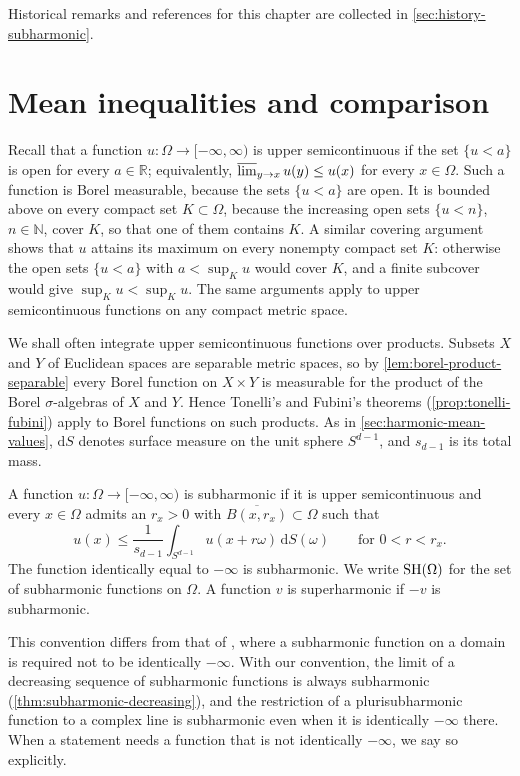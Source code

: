 Historical remarks and references for this chapter are collected in \cref{sec:history-subharmonic}.

\section{Mean inequalities and comparison}
\label{sec:subharmonic-comparison}
Recall that a function $u\colon\Omega\to[-\infty,\infty)$ is upper semicontinuous if the set $\{u<a\}$ is open for every $a\in\mathbb R$; equivalently, $\varlimsup_{y\to x}u(y)\leq u(x)$ for every $x\in\Omega$. Such a function is Borel measurable, because the sets $\{u<a\}$ are open. It is bounded above on every compact set $K\subset\Omega$, because the increasing open sets $\{u<n\}$, $n\in\mathbb N$, cover $K$, so that one of them contains $K$. A similar covering argument shows that $u$ attains its maximum on every nonempty compact set $K$: otherwise the open sets $\{u<a\}$ with $a<\sup_Ku$ would cover $K$, and a finite subcover would give $\sup_Ku<\sup_Ku$. The same arguments apply to upper semicontinuous functions on any compact metric space.

We shall often integrate upper semicontinuous functions over products. Subsets $X$ and $Y$ of Euclidean spaces are separable metric spaces, so by \cref{lem:borel-product-separable} every Borel function on $X\times Y$ is measurable for the product of the Borel $\sigma$-algebras of $X$ and $Y$. Hence Tonelli's and Fubini's theorems (\cref{prop:tonelli-fubini}) apply to Borel functions on such products. As in \cref{sec:harmonic-mean-values}, $\mathrm dS$ denotes surface measure on the unit sphere $S^{d-1}$, and $s_{d-1}$ is its total mass.

\begin{definition}\label{def:subharmonic}
A function $u\colon\Omega\to[-\infty,\infty)$ is subharmonic if it is upper semicontinuous and every $x\in\Omega$ admits an $r_x>0$ with $\overline{B(x,r_x)}\subset\Omega$ such that
\begin{equation}\label{eq:subharmonic-submean}
 u(x)\leq\frac{1}{s_{d-1}}\int_{S^{d-1}}u(x+r\omega)\,\mathrm d S(\omega)\qquad\text{for }0<r<r_x.
\end{equation}
The function identically equal to $-\infty$ is subharmonic. We write $\mathrm{SH}(\Omega)$ for the set of subharmonic functions on $\Omega$. A function $v$ is superharmonic if $-v$ is subharmonic.
\end{definition}
This convention differs from that of \cite[Definition~1.1.1]{XiaSampleBook}, where a subharmonic function on a domain is required not to be identically $-\infty$. With our convention, the limit of a decreasing sequence of subharmonic functions is always subharmonic (\cref{thm:subharmonic-decreasing}), and the restriction of a plurisubharmonic function to a complex line is subharmonic even when it is identically $-\infty$ there. When a statement needs a function that is not identically $-\infty$, we say so explicitly.

